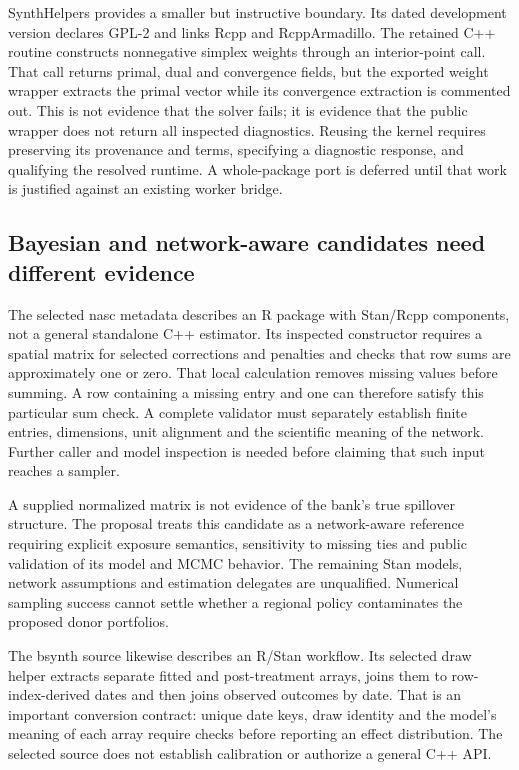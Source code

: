 SynthHelpers provides a smaller but instructive boundary. Its dated
development version declares GPL-2 and links Rcpp and RcppArmadillo.
The retained C++ routine constructs nonnegative simplex weights through
an interior-point call. That call returns primal, dual and convergence
fields, but the exported weight wrapper extracts the primal vector while
its convergence extraction is commented out. This is not evidence that
the solver fails; it is evidence that the public wrapper does not return
all inspected diagnostics. Reusing the kernel requires preserving its
provenance and terms, specifying a diagnostic response, and qualifying
the resolved runtime. A whole-package port is deferred until that work is
justified against an existing worker bridge.~\citep{exec25_synthcross_helpers}

\subsection{Bayesian and network-aware candidates need different evidence}
The selected nasc metadata describes an R package with Stan/Rcpp components,
not a general standalone C++ estimator. Its inspected constructor requires
a spatial matrix for selected corrections and penalties and checks that
row sums are approximately one or zero. That local calculation removes
missing values before summing. A row containing a missing entry and one
can therefore satisfy this particular sum check. A complete validator must
separately establish finite entries, dimensions, unit alignment and the
scientific meaning of the network. Further caller and model inspection
is needed before claiming that such input reaches a sampler.
\citep{exec25_synthcross_nasc,exec25_synthcross_choice}

A supplied normalized matrix is not evidence of the bank's true spillover
structure. The proposal treats this candidate as a network-aware reference
requiring explicit exposure semantics, sensitivity to missing ties and
public validation of its model and MCMC behavior. The remaining Stan models,
network assumptions and estimation delegates are unqualified. Numerical
sampling success cannot settle whether a regional policy contaminates
the proposed donor portfolios.~\citep{exec25_synthcross_choice}

The bsynth source likewise describes an R/Stan workflow. Its selected draw
helper extracts separate fitted and post-treatment arrays, joins them to
row-index-derived dates and then joins observed outcomes by date. That is
an important conversion contract: unique date keys, draw identity and
the model's meaning of each array require checks before reporting an
effect distribution. The selected source does not establish calibration
or authorize a general C++ API.~\citep{exec25_synthcross_bsynth}

